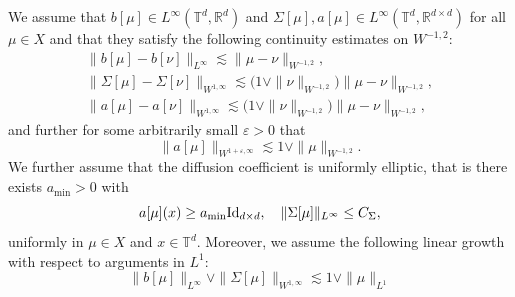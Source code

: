 \begin{assu}\label{assu:b_Sigma}
We assume that $b[\mu] \in L^\infty(\mathbb T^d, \mathbb R^d)$ and $\Sigma[\mu], a[\mu] \in  L^\infty(\mathbb T^d, \mathbb R^{d\times d})$ for all $\mu \in X$ and that they satisfy the following continuity estimates on $W^{-1,2}$:
\begin{align}
    \big\|b[\mu] - b[\nu]\big\|_{L^{\infty}} \lesssim \|\mu - \nu\|_{W^{-1,2}}, \label{eq:con_b_inf}\\
\big\|\Sigma[\mu] - \Sigma[\nu]\big\|_{W^{1,\infty}} \lesssim \big(1 \vee \|\nu\|_{W^{-1,2}}\big)\|\mu - \nu\|_{W^{-1,2}},\label{eq:con_Sigma_1,inf}\\
\big\|a[\mu] - a[\nu]\big\|_{W^{1,\infty}} \lesssim \big(1 \vee \|\nu\|_{W^{-1,2}}\big)\|\mu - \nu\|_{W^{-1,2}},\label{eq:con_a_1,inf}
\end{align}
and further for some arbitrarily small $\varepsilon >0$ that
\begin{equation}\label{eq:1+epsilon-bound-a}
   \big\| a[\mu] \big\|_{W^{1+\varepsilon,\infty}} \lesssim 1 \vee \|\mu\|_{W^{-1,2}}.
\end{equation}
    We further assume that the diffusion coefficient is uniformly elliptic, that is there exists $a_{\min} > 0$ with
    \begin{equation}\label{eq:unif_bound_a}
        a[\mu](x) \geq a_{\min}\mathrm{Id}_{d\times d}, \quad \|\Sigma[\mu]\|_{L^{\infty}} \leq C_{\Sigma}, 
    \end{equation}
uniformly in $\mu \in X$ and $x \in \mathbb T^d$. Moreover, we assume the following linear growth with respect to arguments in $L^1$:
\begin{equation}\label{eq:con_Sigma_L1}
    \|b[\mu]\|_{L^{\infty}} \vee \|\Sigma[\mu]\|_{W^{1,\infty}} \lesssim 1 \vee \|\mu\|_{L^1}
\end{equation}
\end{assu}

